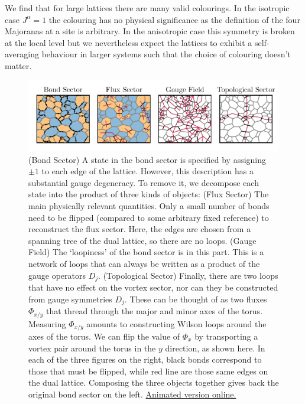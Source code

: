 We find that for large lattices there are many valid colourings. In the isotropic case \(J^\alpha = 1\) the colouring has no physical significance as the definition of the four Majoranas at a site is arbitrary. In the anisotropic case this symmetry is broken at the local level but we nevertheless expect the lattices to exhibit a self-averaging behaviour in larger systems such that the choice of colouring doesn't matter.

\hypertarget{fig:state_decomposition_animated}{%
\begin{figure}
\centering
\includegraphics[width=1\textwidth,height=\textheight]{figure_code/amk_chapter/intro/state_decomposition_animated/state_decomposition_animated}
\caption[{State Decomposition}]{(Bond Sector) A state in the bond sector is specified by assigning \(\pm 1\) to each edge of the lattice. However, this description has a substantial gauge degeneracy. To remove it, we decompose each state into the product of three kinds of objects: (Flux Sector) The main physically relevant quantities. Only a small number of bonds need to be flipped (compared to some arbitrary fixed reference) to reconstruct the flux sector. Here, the edges are chosen from a spanning tree of the dual lattice, so there are no loops. (Gauge Field) The `loopiness' of the bond sector is in this part. This is a network of loops that can always be written as a product of the gauge operators \(D_j\). (Topological Sector) Finally, there are two loops that have no effect on the vortex sector, nor can they be constructed from gauge symmetries \(D_j\). These can be thought of as two fluxes \(\Phi_{x/y}\) that thread through the major and minor axes of the torus. Measuring \(\Phi_{x/y}\) amounts to constructing Wilson loops around the axes of the torus. We can flip the value of \(\Phi_{x}\) by transporting a vortex pair around the torus in the \(y\) direction, as shown here. In each of the three figures on the right, black bonds correspond to those that must be flipped, while red line are those same edges on the dual lattice. Composing the three objects together gives back the original bond sector on the left. \href{http://thomashodson.com/assets/thesis/amk_chapter/intro/state_decomposition_animated/state_decomposition_animated.gif}{ Animated version online.}}
\label{fig:state_decomposition_animated}
\end{figure}
}

